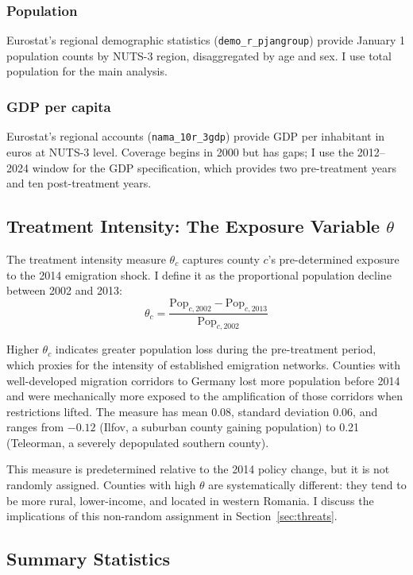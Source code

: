 \documentclass[12pt]{article}
\begin{document}
\subsubsection*{Population} Eurostat's regional demographic statistics (\texttt{demo\_r\_pjangroup}) provide January 1 population counts by NUTS-3 region, disaggregated by age and sex. I use total population for the main analysis.

\subsubsection*{GDP per capita} Eurostat's regional accounts (\texttt{nama\_10r\_3gdp}) provide GDP per inhabitant in euros at NUTS-3 level. Coverage begins in 2000 but has gaps; I use the 2012--2024 window for the GDP specification, which provides two pre-treatment years and ten post-treatment years.

\subsection{Treatment Intensity: The Exposure Variable $\theta$}

The treatment intensity measure $\theta_c$ captures county $c$'s pre-determined exposure to the 2014 emigration shock. I define it as the proportional population decline between 2002 and 2013:
\begin{equation}
\theta_c = \frac{\text{Pop}_{c,2002} - \text{Pop}_{c,2013}}{\text{Pop}_{c,2002}}
\label{eq:theta}
\end{equation}

Higher $\theta_c$ indicates greater population loss during the pre-treatment period, which proxies for the intensity of established emigration networks. Counties with well-developed migration corridors to Germany lost more population before 2014 and were mechanically more exposed to the amplification of those corridors when restrictions lifted. The measure has mean 0.08, standard deviation 0.06, and ranges from $-0.12$ (Ilfov, a suburban county gaining population) to 0.21 (Teleorman, a severely depopulated southern county).

This measure is predetermined relative to the 2014 policy change, but it is not randomly assigned. Counties with high $\theta$ are systematically different: they tend to be more rural, lower-income, and located in western Romania. I discuss the implications of this non-random assignment in Section~\ref{sec:threats}.

\subsection{Summary Statistics}
\end{document}
